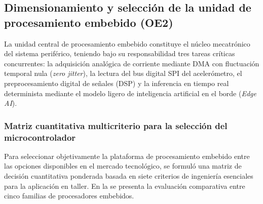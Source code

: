 \subsection{Dimensionamiento y selección de la unidad de procesamiento embebido (OE2)}
\label{subsec:dimensionamiento_procesamiento}

La unidad central de procesamiento embebido constituye el núcleo mecatrónico del sistema periférico, teniendo bajo su responsabilidad tres tareas críticas concurrentes: la adquisición analógica de corriente mediante DMA con fluctuación temporal nula (\textit{zero jitter}), la lectura del bus digital SPI del acelerómetro, el preprocesamiento digital de señales (DSP) y la inferencia en tiempo real determinista mediante el modelo ligero de inteligencia artificial en el borde (\textit{Edge AI}).

\subsubsection{Matriz cuantitativa multicriterio para la selección del microcontrolador}
\label{subsubsec:matriz_seleccion_mcu}

Para seleccionar objetivamente la plataforma de procesamiento embebido entre las opciones disponibles en el mercado tecnológico, se formuló una matriz de decisión cuantitativa ponderada basada en siete criterios de ingeniería esenciales para la aplicación en taller. En la  se presenta la evaluación comparativa entre cinco familias de procesadores embebidos.

